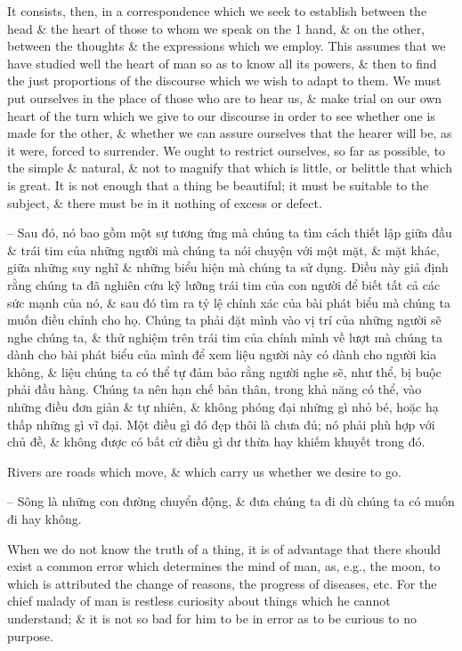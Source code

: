 \documentclass{article}
\begin{document}
\begin{enumerate}
\begin{itemize}
		It consists, then, in a correspondence which we seek to establish between the head \& the heart of those to whom we speak on the 1 hand, \& on the other, between the thoughts \& the expressions which we employ. This assumes that we have studied well the heart of man so as to know all its powers, \& then to find the just proportions of the discourse which we wish to adapt to them. We must put ourselves in the place of those who are to hear us, \& make trial on our own heart of the turn which we give to our discourse in order to see whether one is made for the other, \& whether we can assure ourselves that the hearer will be, as it were, forced to surrender. We ought to restrict ourselves, so far as possible, to the simple \& natural, \& not to magnify that which is little, or belittle that which is great. It is not enough that a thing be beautiful; it must be suitable to the subject, \& there must be in it nothing of excess or defect.
		
		-- Sau đó, nó bao gồm một sự tương ứng mà chúng ta tìm cách thiết lập giữa đầu \& trái tim của những người mà chúng ta nói chuyện với một mặt, \& mặt khác, giữa những suy nghĩ \& những biểu hiện mà chúng ta sử dụng. Điều này giả định rằng chúng ta đã nghiên cứu kỹ lưỡng trái tim của con người để biết tất cả các sức mạnh của nó, \& sau đó tìm ra tỷ lệ chính xác của bài phát biểu mà chúng ta muốn điều chỉnh cho họ. Chúng ta phải đặt mình vào vị trí của những người sẽ nghe chúng ta, \& thử nghiệm trên trái tim của chính mình về lượt mà chúng ta dành cho bài phát biểu của mình để xem liệu người này có dành cho người kia không, \& liệu chúng ta có thể tự đảm bảo rằng người nghe sẽ, như thể, bị buộc phải đầu hàng. Chúng ta nên hạn chế bản thân, trong khả năng có thể, vào những điều đơn giản \& tự nhiên, \& không phóng đại những gì nhỏ bé, hoặc hạ thấp những gì vĩ đại. Một điều gì đó đẹp thôi là chưa đủ; nó phải phù hợp với chủ đề, \& không được có bất cứ điều gì dư thừa hay khiếm khuyết trong đó.
		
		 Rivers are roads which move, \& which carry us whether we desire to go.
		
		-- Sông là những con đường chuyển động, \& đưa chúng ta đi dù chúng ta có muốn đi hay không.
		
		 When we do not know the truth of a thing, it is of advantage that there should exist a common error which determines the mind of man, as, e.g., the moon, to which is attributed the change of reasons, the progress of diseases, etc. For the chief malady of man is restless curiosity about things which he cannot understand; \& it is not so bad for him to be in error as to be curious to no purpose.
		

\end{itemize}
\end{enumerate}
\end{document}

